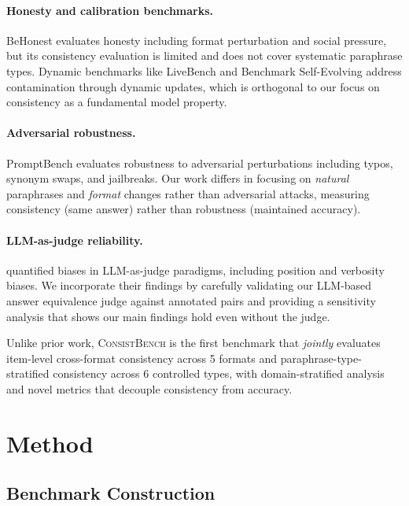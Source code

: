 \documentclass{article}
\newcommand{\consistbench}{\textsc{ConsistBench}}
\begin{document}
\paragraph{Honesty and calibration benchmarks.}
BeHonest \citep{chern2024behonest} evaluates honesty including format perturbation and social pressure, but its consistency evaluation is limited and does not cover systematic paraphrase types. Dynamic benchmarks like LiveBench \citep{white2025livebench} and Benchmark Self-Evolving \citep{wang2025benchmark} address contamination through dynamic updates, which is orthogonal to our focus on consistency as a fundamental model property.

\paragraph{Adversarial robustness.}
PromptBench \citep{zhu2024promptbench} evaluates robustness to adversarial perturbations including typos, synonym swaps, and jailbreaks. Our work differs in focusing on \emph{natural} paraphrases and \emph{format} changes rather than adversarial attacks, measuring consistency (same answer) rather than robustness (maintained accuracy).

\paragraph{LLM-as-judge reliability.}
\citet{ye2024justice} quantified biases in LLM-as-judge paradigms, including position and verbosity biases. We incorporate their findings by carefully validating our LLM-based answer equivalence judge against annotated pairs and providing a sensitivity analysis that shows our main findings hold even without the judge.

Unlike prior work, \consistbench{} is the first benchmark that \emph{jointly} evaluates item-level cross-format consistency across 5 formats and paraphrase-type-stratified consistency across 6 controlled types, with domain-stratified analysis and novel metrics that decouple consistency from accuracy.

\section{Method}
\label{sec:method}

\subsection{Benchmark Construction}
\end{document}
